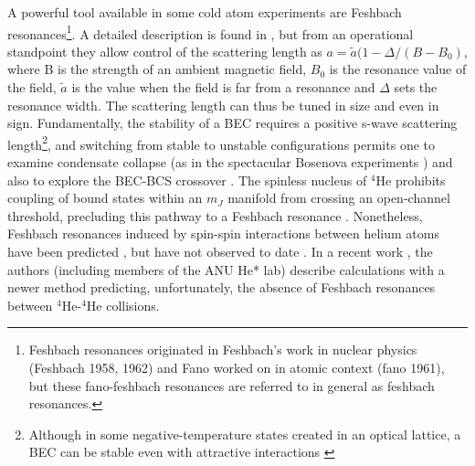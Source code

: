 	A powerful tool available in some cold atom experiments are Feshbach resonances\footnote{Feshbach resonances originated in Feshbach's work in nuclear physics (Feshbach 1958, 1962) and Fano worked on in atomic context (fano 1961), but these fano-feshbach resonances are referred to in general as feshbach resonances.
	}.
	A detailed description is found in \cite{Chin10}, but from an operational standpoint they allow control of the scattering length as $a = \tilde{a}(1-\Delta/(B-B_0)$, where B is the strength of an ambient magnetic field, $B_0$ is the resonance value of the field, $\tilde{a}$ is the value when the field is far from a resonance and $\Delta$ sets the resonance width.
	The scattering length can thus be tuned in size and even in sign.
	Fundamentally, the stability of a BEC requires a positive s-wave scattering length\footnote{Although in some negative-temperature states created in an optical lattice, a BEC can be stable even with attractive interactions \cite{Braun13}}, and switching from stable to unstable configurations permits one to examine condensate collapse (as in the spectacular Bosenova experiments \cite{Papers}) and also to explore the BEC-BCS crossover \cite{Papers}.
	The spinless nucleus of $^4$He prohibits coupling of bound states within an $m_J$ manifold from crossing an open-channel threshold, precluding this pathway to a Feshbach resonance \cite{Goosen10}.
	Nonetheless, Feshbach resonances induced by spin-spin interactions between helium atoms have been predicted \cite{Venturi99, goosen10}, but have not observed to date \cite{Borbely12}.
	In a recent work \cite{Hirsh21}, the authors (including members of the ANU He* lab) describe calculations with a newer method predicting, unfortunately, the absence of Feshbach resonances between $^4$He-$^4$He collisions.
	

